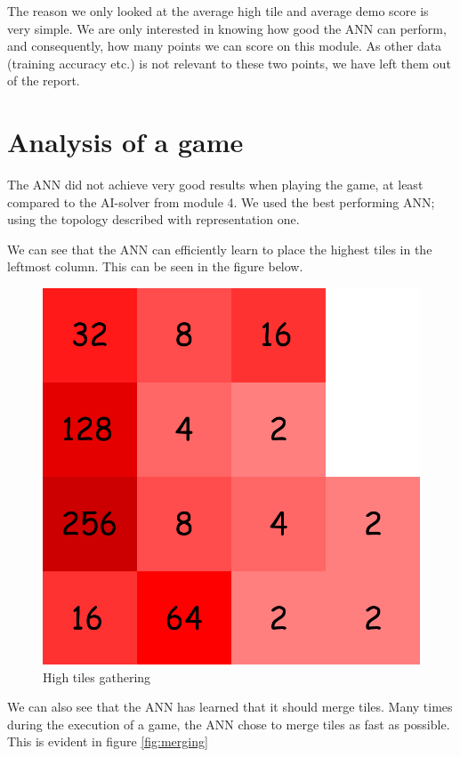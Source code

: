 \documentclass{article}
\begin{document}
The reason we only looked at the average high tile and average demo score is very simple. We are only interested in knowing how good the ANN can perform, and consequently, how many points we can score on this module. As other data (training accuracy etc.) is not relevant to these two points, we have left them out of the report. 

\section{Analysis of a game}

The ANN did not achieve very good results when playing the game, at least compared to the AI-solver from module 4. We used the best performing ANN; using the topology described with representation one. 

We can see that the ANN can efficiently learn to place the highest tiles in the leftmost column. This can be seen in the figure below.

\begin{figure}
\centering
\includegraphics[scale=0.2]{images/samling.png}
\caption{High tiles gathering}
\label{fig:my_label}
\end{figure}

We can also see that the ANN has learned that it should merge tiles. Many times during the execution of a game, the ANN chose to merge tiles as fast as possible. This is evident in figure \ref{fig:merging}
\end{document}
